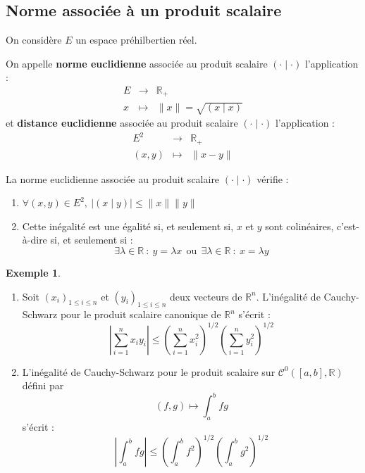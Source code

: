 \documentclass[french]{article}
\newcommand{\R}{\mathbb{R}}
\theoremstyle{plain}
\theoremstyle{definition}
\newtheorem*{ex}{Exemple}
\theoremstyle{remark}
\begin{document}
\subsection{Norme associée à un produit scalaire}

On considère $E$ un espace préhilbertien réel.

\begin{dfn}
	On appelle \textbf{norme euclidienne} associée au produit scalaire $(\cdot\mid\cdot)$ l'application : $$\begin{array}{rcl}
		E&\longrightarrow&\R_+ \\
		x&\longmapsto&\lVert x\rVert=\sqrt{(x\mid x)}
	\end{array}$$ et \textbf{distance euclidienne} associée au produit scalaire $(\cdot\mid\cdot)$ l'application : $$\begin{array}{rcl}
	E^2&\longrightarrow&\R_+ \\
	(x,y)&\longmapsto&\lVert x-y\rVert
	\end{array}$$
\end{dfn}

\begin{prop}
	La norme euclidienne associée au produit scalaire $(\cdot\mid\cdot)$ vérifie : 
	\begin{enumerate}
		\item $\forall (x,y)\in E^2,\ \lvert (x\mid y)\rvert\leqslant\lVert x\rVert\lVert y\rVert$
		\item Cette inégalité est une égalité si, et seulement si, $x$ et $y$ sont colinéaires, c'est-à-dire si, et seulement si : $$\exists\lambda\in\R\ : \ y=\lambda x\ \ \text{ou}\ \ \exists\lambda\in\R\ : \ x=\lambda y$$
	\end{enumerate}
\end{prop}

\begin{ex}
	\begin{enumerate}
		\item Soit $(x_i)_{1\leqslant i\leqslant n}$ et $(y_i)_{1\leqslant i\leqslant n}$ deux vecteurs de $\R^n$. L'inégalité de Cauchy-Schwarz pour le produit scalaire canonique de $\R^n$ s'écrit : $$\left\lvert\sum_{i=1}^{n}x_iy_i\right\rvert\leqslant\left(\sum_{i=1}^{n}x_i^2\right)^{1/2}\left(\sum_{i=1}^{n}y_i^2\right)^{1/2}$$
		\item L'inégalité de Cauchy-Schwarz pour le produit scalaire sur $\mathcal{C}^0([a,b],\R)$ défini par $$(f,g)\mapsto\int_{a}^{b}fg$$ s'écrit : $$\left\lvert \int_{a}^{b}fg\right\rvert\leqslant\left(\int_{a}^{b}f^2\right)^{1/2}\left(\int_{a}^{b}g^2\right)^{1/2}$$
	\end{enumerate}
\end{ex}
\end{document}
